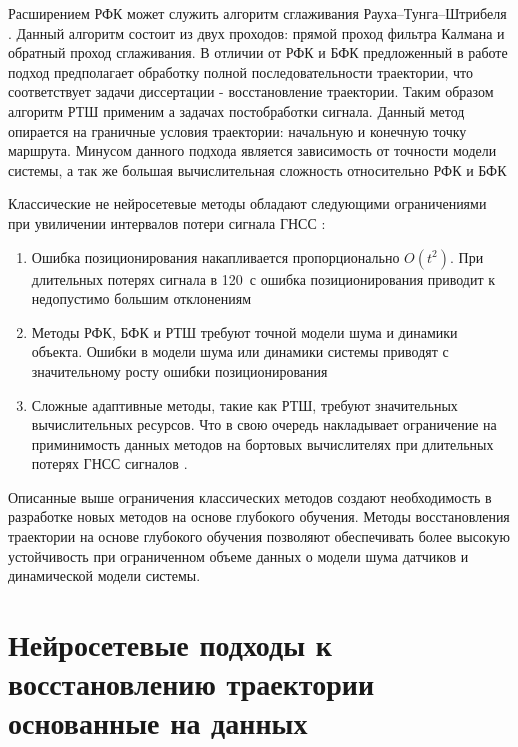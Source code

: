 Расширением РФК может служить алгоритм сглаживания Рауха–Тунга–Штрибеля \cite{Fang2020}. Данный алгоритм состоит из двух проходов: прямой проход фильтра Калмана и обратный проход сглаживания. В отличии от РФК и БФК предложенный в работе \cite{Fang2020} подход предполагает обработку полной последовательности траектории, что соответствует задачи диссертации - восстановление траектории. Таким образом алгоритм РТШ применим а задачах постобработки сигнала. Данный метод опирается на граничные условия траектории: начальную и конечную точку маршрута. Минусом данного подхода является зависимость от точности модели системы, а так же большая вычислительная сложность относительно РФК и БФК \cite{Saif2022, Tahir2016}

Классические не нейросетевые методы обладают следующими ограничениями при увиличении интервалов потери сигнала ГНСС \cite{Cahyadi2023, Eling2015, Fang2020}: 
\begin{enumerate}
	\item Ошибка позиционирования накапливается пропорционально \(O(t^2)\). При длительных потерях сигнала в 120~с ошибка позиционирования приводит к недопустимо большим отклонениям
	\item Методы РФК, БФК и РТШ требуют точной модели шума и динамики объекта.
	Ошибки в модели шума или динамики системы приводят с значительному росту ошибки позиционирования \cite{Saif2022}
	\item Сложные адаптивные методы, такие как РТШ, требуют значительных вычислительных ресурсов. Что в свою очередь накладывает ограничение на приминимость данных методов на бортовых вычислителях при длительных потерях ГНСС сигналов \cite{Tahir2016, Burri2016}.
\end{enumerate}	

Описанные выше ограничения классических методов создают необходимость в разработке новых методов на основе глубокого обучения\cite{Meyer2012, Koenig2004}. Методы восстановления траектории на основе глубокого обучения позволяют обеспечивать более высокую устойчивость при ограниченном объеме данных о модели шума датчиков и динамической модели системы. 


\section{Нейросетевые подходы к восстановлению траектории основанные на данных}
\label{sec:1.3}

